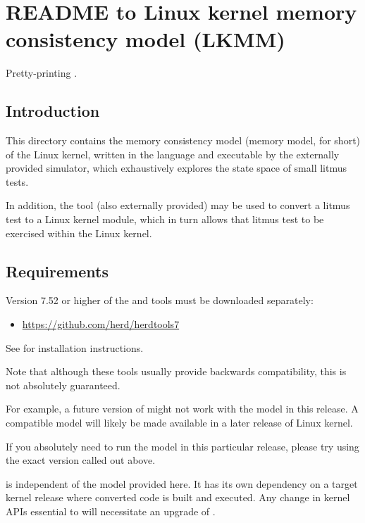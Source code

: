 \chapter{README to Linux kernel memory consistency model (LKMM)}

Pretty-printing .

\section{Introduction}

This directory contains the memory consistency model (memory model, for
short) of the Linux kernel, written in the  language and executable
by the externally provided  simulator, which exhaustively explores
the state space of small litmus tests.

In addition, the  tool (also externally provided) may be used
to convert a litmus test to a Linux kernel module, which in turn allows
that litmus test to be exercised within the Linux kernel.


\section{Requirements}

Version 7.52 or higher of the  and  tools must be
downloaded separately:

\begin{itemize}
  \item \url{https://github.com/herd/herdtools7}
\end{itemize}

See  for installation instructions.

Note that although these tools usually provide backwards compatibility,
this is not absolutely guaranteed.

For example, a future version of  might not work with the model
in this release.
A compatible model will likely be made available in a later release of
Linux kernel.

If you absolutely need to run the model in this particular release,
please try using the exact version called out above.

 is independent of the model provided here.  It has its own
dependency on a target kernel release where converted code is built
and executed.  Any change in kernel APIs essential to  will
necessitate an upgrade of .

